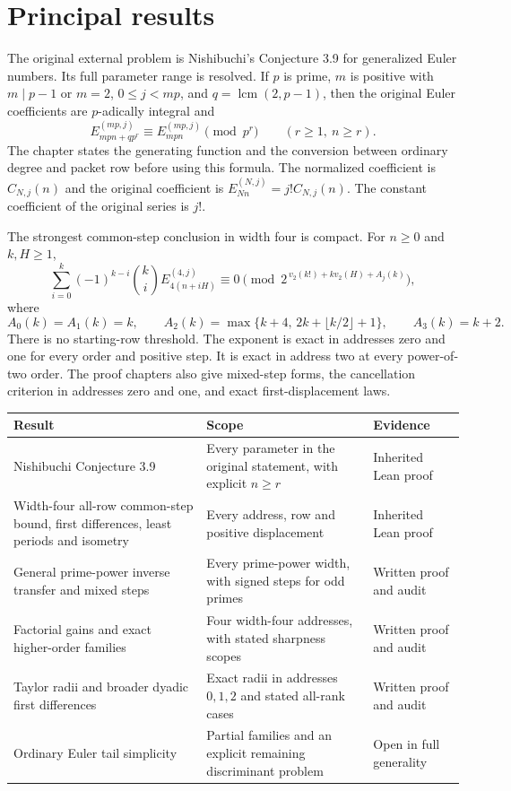 \section*{Principal results}
The original external problem is Nishibuchi's Conjecture 3.9 for generalized Euler numbers. Its full parameter range is resolved. If $p$ is prime, $m$ is positive with $m\mid p-1$ or $m=2$, $0\le j<mp$, and $q=\operatorname{lcm}(2,p-1)$, then the original Euler coefficients are $p$-adically integral and
\[
 E_{mpn+qp^r}^{(mp,j)}\equiv E_{mpn}^{(mp,j)}\pmod{p^r}
 \qquad (r\ge1,\ n\ge r).
\]
The chapter states the generating function and the conversion between ordinary degree and packet row before using this formula. The normalized coefficient is $C_{N,j}(n)$ and the original coefficient is $E_{Nn}^{(N,j)}=j!C_{N,j}(n)$. The constant coefficient of the original series is $j!$.

The strongest common-step conclusion in width four is compact. For $n\ge0$ and $k,H\ge1$,
\begin{equation*}
 \sum_{i=0}^k(-1)^{k-i}\binom ki E_{4(n+iH)}^{(4,j)}
 \equiv0\pmod{2^{\,v_2(k!)+kv_2(H)+A_j(k)}},
\end{equation*}
where
\[
 A_0(k)=A_1(k)=k,\qquad
 A_2(k)=\max\{k+4,\,2k+\lfloor k/2\rfloor+1\},\qquad
 A_3(k)=k+2.
\]
There is no starting-row threshold. The exponent is exact in addresses zero and one for every order and positive step. It is exact in address two at every power-of-two order. The proof chapters also give mixed-step forms, the cancellation criterion in addresses zero and one, and exact first-displacement laws.

\begin{center}
\small
\begin{tabularx}{\linewidth}{@{}>{\raggedright\arraybackslash}p{.29\linewidth}>{\raggedright\arraybackslash}X>{\raggedright\arraybackslash}p{.21\linewidth}@{}}
\toprule
Result & Scope & Evidence\\
\midrule
Nishibuchi Conjecture 3.9 & Every parameter in the original statement, with explicit $n\ge r$ & Inherited Lean proof\\
Width-four all-row common-step bound, first differences, least periods and isometry & Every address, row and positive displacement & Inherited Lean proof\\
General prime-power inverse transfer and mixed steps & Every prime-power width, with signed steps for odd primes & Written proof and audit\\
Factorial gains and exact higher-order families & Four width-four addresses, with stated sharpness scopes & Written proof and audit\\
Taylor radii and broader dyadic first differences & Exact radii in addresses $0,1,2$ and stated all-rank cases & Written proof and audit\\
Ordinary Euler tail simplicity & Partial families and an explicit remaining discriminant problem & Open in full generality\\
\bottomrule
\end{tabularx}
\end{center}

